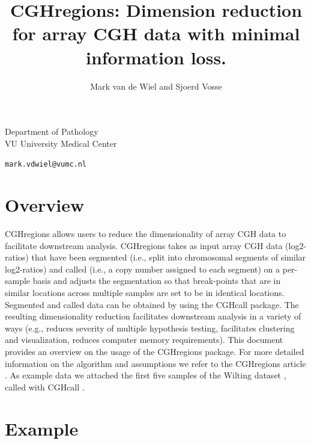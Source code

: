 \documentclass[11pt]{article}
\begin{document}

\title{\bf CGHregions: Dimension reduction for array CGH data with minimal information loss.}

\author{Mark van de Wiel and Sjoerd Vosse}

\maketitle

\begin{center}
Department of Pathology\\
VU University Medical Center
\end{center}

\begin{center}

{\tt mark.vdwiel@vumc.nl}
\end{center}


\tableofcontents

\section{Overview}

CGHregions allows users to reduce the dimensionality of array CGH data to facilitate downstream analysis. CGHregions takes as input array CGH data (log2-ratios) that have been segmented (i.e., split into chromosomal segments of similar log2-ratios) and called (i.e., a copy number assigned to each segment) on a per-sample basis and adjusts the segmentation so that break-points that are in similar locations across multiple samples are set to be in identical locations. Segmented and called data can be obtained by using the CGHcall package. The resulting dimensionality reduction facilitates downstream analysis in a variety of ways (e.g., reduces severity of multiple hypothesis testing, facilitates clustering and visualization, reduces computer memory requirements). This document provides an overview on the usage of the CGHregions package. For more detailed information on the algorithm and assumptions we refer to the CGHregions article \citep{CGHregions}. As example data we attached the first five samples of the Wilting dataset \citep{Wilting}, called with CGHcall \citep{CGHcall}. 

\section{Example}
\end{document}
